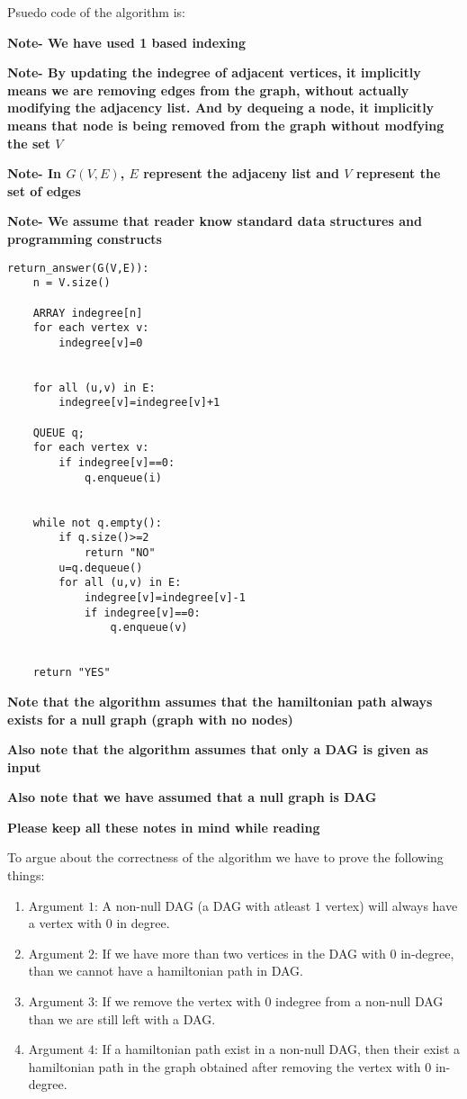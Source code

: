\documentclass[answers]{exam}
\begin{document}
\begin{questions}
\begin{enumerate}
\begin{solution}
\par Psuedo code of the algorithm is:
\par
\textbf{Note- We have used 1 based indexing }
\par
\textbf{Note- By updating the indegree of adjacent vertices, it implicitly means we are removing  edges from the graph, without actually modifying the adjacency list. And by dequeing a node, it implicitly means that node is being removed from the graph without modfying the set $V$}
\par
\textbf{Note- In $G(V,E)$, $E$ represent the adjaceny list and $V$ represent the set of edges}
\par
\textbf{Note- We assume that reader know standard data structures and programming constructs}
\par
\begin{verbatim}
return_answer(G(V,E)):
    n = V.size()
    
    ARRAY indegree[n]
    for each vertex v:
        indegree[v]=0


    for all (u,v) in E:
        indegree[v]=indegree[v]+1

    QUEUE q;
    for each vertex v:
        if indegree[v]==0:
            q.enqueue(i)
    
    
    while not q.empty():
        if q.size()>=2
            return "NO"
        u=q.dequeue()
        for all (u,v) in E:
            indegree[v]=indegree[v]-1
            if indegree[v]==0:
                q.enqueue(v)


    return "YES"
\end{verbatim}

\textbf{Note that the algorithm assumes that the hamiltonian path always exists for a null graph (graph with no nodes)}\par

\textbf{Also note that the algorithm assumes that only a DAG is given as input}\par
\textbf{Also note that we have assumed that a null graph is DAG}\par
\textbf{Please keep all these notes in mind while reading}


To argue about the correctness of the algorithm we have to prove the following things:
\begin{enumerate}
    \item Argument $1$: A non-null DAG (a DAG with atleast $1$ vertex) will always have a vertex with $0$ in degree.
    \item Argument $2$: If we have more than two vertices in the DAG with $0$ in-degree, than we cannot have a hamiltonian path in DAG.
    \item Argument $3$: If we remove the vertex with $0$ indegree from a non-null DAG than we are still left with a DAG.
    \item Argument $4$: If a hamiltonian path exist in a non-null DAG, then their exist a hamiltonian path in the graph obtained after removing the vertex with $0$ in-degree.    
\end{enumerate}


\end{solution}
\end{enumerate}
\end{questions}
\end{document}
